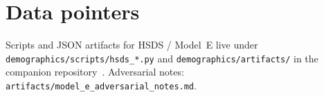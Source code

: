 \documentclass[11pt,a4paper]{article}
\begin{document}
\section{Data pointers}
Scripts and JSON artifacts for HSDS / Model~E live under \texttt{demographics/scripts/hsds\_*.py} and \texttt{demographics/artifacts/} in the companion repository~\citep{repo}.
Adversarial notes: \texttt{artifacts/model\_e\_adversarial\_notes.md}.



\end{document}
